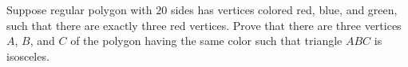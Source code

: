 Suppose regular polygon with $20$ sides has vertices colored red, blue, and green, such that there are exactly three red vertices. Prove that there are three vertices $A$, $B$, and $C$ of the polygon having the same color such that triangle $ABC$ is isosceles.
